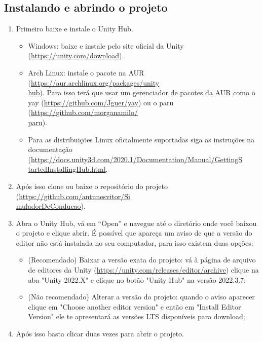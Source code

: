 \begin{apendicesenv}
\subsection*{Instalando e abrindo o projeto}

 \begin{enumerate}
    \item Primeiro baixe e instale o Unity Hub.
    \begin{itemize}
        \item Windows: baixe e instale pelo site oficial da Unity (\href{https://unity.com/download}{https://unity.com/download}).
        \item Arch Linux: instale o pacote na AUR (\href{https://aur.archlinux.org/packages/unityhub}{https://aur.archlinux.org/packages/unity\\hub}). Para isso terá que usar um gerenciador de pacotes da AUR como o yay (\href{https://github.com/Jguer/yay}{https://github.com/Jguer/yay}) ou o paru (\href{https://github.com/morganamilo/paru}{https://github.com/morganamilo/\\paru}).
        \item Para as distribuições Linux oficialmente suportadas siga as instruções na documentação (\href{https://docs.unity3d.com/2020.1/Documentation/Manual/GettingStartedInstallingHub.html}{https://docs.unity3d.com/2020.1/Documentation/Manual/GettingS\\tartedInstallingHub.html}.
    \end{itemize}
    \item Após isso clone ou baixe o repositório do projeto (\href{https://github.com/antunesvitor/SimuladorDeConducao}{https://github.com/antunesvitor/Si\\muladorDeConducao}).
    \item Abra o Unity Hub, vá em ``Open'' e navegue até o diretório onde você baixou o projeto e clique abrir. É possível que apareça um aviso de que a versão do editor não está instalada no seu computador, para isso existem duas opções:
    \begin{itemize}
        \item (Recomendado) Baixar a versão exata do projeto: vá à página de arquivo de editores da Unity (\href{https://unity.com/releases/editor/archive}{https://unity.com/releases/editor/archive}) clique na aba "Unity 2022.X"{} e clique no botão  "Unity Hub"{} na versão 2022.3.7;
        \item (Não recomendado) Alterar a versão do projeto: quando o aviso aparecer clique em "Choose another editor version"{} e então em "Install Editor Version"{} ele te apresentará as versões LTS disponíveis para download;
    \end{itemize}
    \item Após isso basta clicar duas vezes para abrir o projeto.
 \end{enumerate}


\end{apendicesenv}
